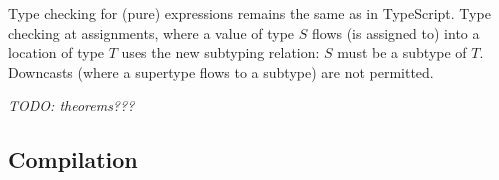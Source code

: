 Type checking for (pure) expressions remains the same as in TypeScript.
Type checking at assignments, where a value of type $S$ flows (is assigned to) 
into a location of type $T$ uses the new subtyping relation: $S$
must be a subtype of $T$.  Downcasts (where a supertype flows to a subtype)
are not permitted. 

\emph{TODO: theorems???}

\subsection{Compilation}

